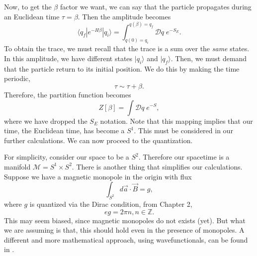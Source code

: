 \documentclass{article}
\begin{document}
Now, to get the $\beta$ factor we want, we can say that the particle propagates during an Euclidean time $\tau=\beta$. Then the amplitude becomes 
\begin{equation*}
	\langle q_f|e^{-H\beta}|q_i \rangle=\int_{q(0)=q_i}^{q(\beta)=q_f} \mathcal{D}q\;e^{-S_E}.
\end{equation*}
To obtain the trace, we must recall that the trace is a sum over the \textit{same} states. In this amplitude, we have different states $|q_i\rangle$ and $|q_f\rangle$. Then, we must demand that the particle return to its initial position. We do this by making the time periodic,
\begin{equation*}
	\tau \sim \tau +\beta. 
\end{equation*}
Therefore, the partition function becomes 
\begin{equation}\label{partition function}
	Z[\beta]=\int\mathcal{D}q\; e^{-S},
\end{equation}
where we have dropped the $S_E$ notation. Note that this mapping implies that our time, the Euclidean time, has become a $S^1$. This must be considered in our further calculations. We can now proceed to the quantization. 

For simplicity, consider our space to be a $S^2$. Therefore our spacetime is a manifold $\mathcal{M}=S^1\times S^2$. There is another thing that simplifies our calculations. Suppose we have a magnetic monopole in the origin with flux
\begin{equation}
	\int_{S^2} d\vec{a}\cdot \vec{B}=g,
\end{equation} 
where $g$ is quantized via the Dirac condition, from Chapter 2, 
\begin{equation}
	eg=2\pi n,n\in\mathbb{Z}.
\end{equation}
This may seem biased, since magnetic monopoles do not exists  (yet). But what we are assuming is that, this should hold even in the presence of monopoles. A different and more mathematical approach, using wavefunctionals, can be found in \cite{dunne_aspects_1999, dunne_topological_1990,girvin_quantum_1999}. 
\end{document}
